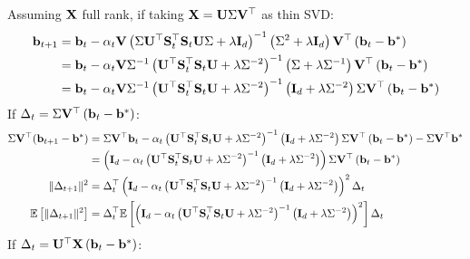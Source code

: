 \documentclass[10pt]{article}
\begin{document}
Assuming $\mathbf{X}$ full rank, if taking $\mathbf{X}=\mathbf{U}\Sigma\mathbf{V}^\top$ as thin SVD:
\begin{align*}
\mathbf{b}_{t+1} &= \mathbf{b}_t - \alpha_t\mathbf{V}\left(\Sigma\mathbf{U}^\top\mathbf{S}_t^\top\mathbf{S}_t\mathbf{U}\Sigma + \lambda\mathbf{I}_d\right)^{-1}\left(\Sigma^2 + \lambda\mathbf{I}_d \right)\mathbf{V}^\top\left(\mathbf{b}_t-\mathbf{b}^*\right) \\
&= \mathbf{b}_t - \alpha_t\mathbf{V}\Sigma^{-1}\left(\mathbf{U}^\top\mathbf{S}_t^\top\mathbf{S}_t\mathbf{U} + \lambda\Sigma^{-2}\right)^{-1}\left(\Sigma + \lambda\Sigma^{-1} \right)\mathbf{V}^\top\left(\mathbf{b}_t-\mathbf{b}^*\right) \\
&= \mathbf{b}_t - \alpha_t\mathbf{V}\Sigma^{-1}\left(\mathbf{U}^\top\mathbf{S}_t^\top\mathbf{S}_t\mathbf{U} + \lambda\Sigma^{-2}\right)^{-1}\left(\mathbf{I}_d + \lambda\Sigma^{-2} \right)\Sigma\mathbf{V}^\top\left(\mathbf{b}_t-\mathbf{b}^*\right)
\end{align*}
If $\Delta_t=\Sigma\mathbf{V}^\top\left(\mathbf{b}_t-\mathbf{b}^*\right)$:
\begin{align*}
\Sigma\mathbf{V}^\top(\mathbf{b}_{t+1}-\mathbf{b}^*) &= \Sigma\mathbf{V}^\top\mathbf{b}_t - \alpha_t\left(\mathbf{U}^\top\mathbf{S}_t^\top\mathbf{S}_t\mathbf{U} + \lambda\Sigma^{-2}\right)^{-1}\left(\mathbf{I}_d + \lambda\Sigma^{-2}\right)\Sigma\mathbf{V}^\top\left(\mathbf{b}_t-\mathbf{b}^*\right) - \Sigma\mathbf{V}^\top\mathbf{b}^* \\
&= \left(\mathbf{I}_d - \alpha_t\left(\mathbf{U}^\top\mathbf{S}_t^\top\mathbf{S}_t\mathbf{U} + \lambda\Sigma^{-2}\right)^{-1}\left(\mathbf{I}_d + \lambda\Sigma^{-2}\right)\right)\Sigma\mathbf{V}^\top\left(\mathbf{b}_t-\mathbf{b}^*\right) \\
\|\Delta_{t+1}\|^2 &= \Delta_t^\top\left(\mathbf{I}_d - \alpha_t\left(\mathbf{U}^\top\mathbf{S}_t^\top\mathbf{S}_t\mathbf{U} + \lambda\Sigma^{-2}\right)^{-1}\left(\mathbf{I}_d + \lambda\Sigma^{-2}\right)\right)^2\Delta_t \\
\mathbb{E}\left[\|\Delta_{t+1}\|^2\right] &= \Delta_t^\top\mathbb{E}\left[\left(\mathbf{I}_d - \alpha_t\left(\mathbf{U}^\top\mathbf{S}_t^\top\mathbf{S}_t\mathbf{U} + \lambda\Sigma^{-2}\right)^{-1}\left(\mathbf{I}_d + \lambda\Sigma^{-2}\right)\right)^2\right]\Delta_t 
\end{align*}
If $\Delta_t=\mathbf{U}^\top\mathbf{X}\left(\mathbf{b}_t-\mathbf{b}^*\right)$:
\end{document}
